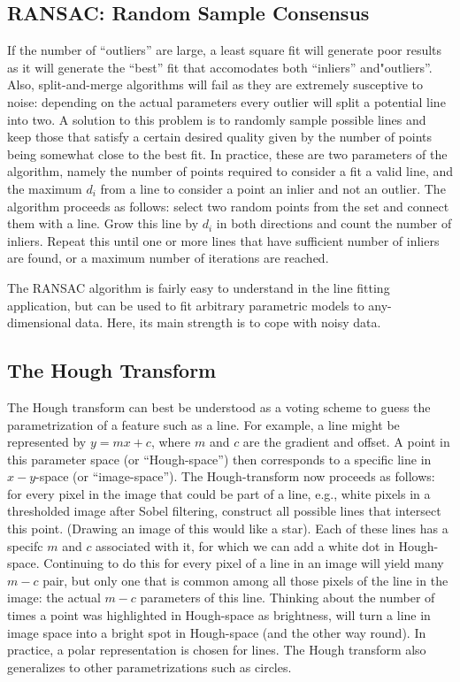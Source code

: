 \subsection{RANSAC: Random Sample Consensus}
If the number of ``outliers'' are large, a least square fit will generate poor results as it will generate the ``best'' fit that accomodates both ``inliers'' and"outliers''. Also, split-and-merge algorithms will fail as they are extremely susceptive to noise: depending on the actual parameters every outlier will split a potential line into two. A solution to this problem is to randomly sample possible lines and keep those that satisfy a certain desired quality given by the number of points being somewhat close to the best fit. In practice, these are two parameters of the algorithm, namely the number of points required to consider a fit a valid line, and the maximum $ d_i$ from a line to consider a point an inlier and not an outlier. The algorithm proceeds as follows: select two random points from the set and connect them with a line. Grow this line by $ d_i$ in both directions and count the number of inliers. Repeat this until one or more lines that have sufficient number of inliers are found, or a maximum number of iterations are reached.

The RANSAC algorithm is fairly easy to understand in the line fitting application, but can be used to fit arbitrary parametric models to any-dimensional data. Here, its main strength is to cope with noisy data.

\subsection{The Hough Transform}
The Hough transform  can best be understood as a voting scheme to guess the parametrization of a feature such as a line. For example, a line might be represented by $y=mx+c$, where $m$ and $c$ are the gradient and offset. A point in this parameter space (or ``Hough-space'') then corresponds to a specific line in $x-y$-space (or ``image-space''). The Hough-transform now proceeds as follows: for every pixel in the image that could be part of a line, e.g., white pixels in a thresholded image after Sobel filtering, construct all possible lines that intersect this point. (Drawing an image of this would like a star). Each of these lines has a specifc $m$ and $c$ associated with it, for which we can add a white dot in Hough-space. Continuing to do this for every pixel of a line in an image will yield many $m-c$ pair, but only one that is common among all those pixels of the line in the image: the actual $m-c$ parameters of this line. Thinking about the number of times a point was highlighted in Hough-space as brightness, will turn a line in image space into a bright spot in Hough-space (and the other way round). In practice, a polar representation is chosen for lines. The Hough transform also generalizes to other parametrizations such as circles.  


